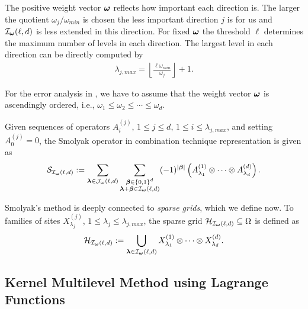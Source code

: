 \documentclass[	a4paper, 
								11pt]{article}
\theoremstyle{plain}
\begin{document}
The positive weight vector $ \boldsymbol{\omega} $ reflects how important each
direction is. The larger the quotient $ \omega_j / \omega_{min} $ is chosen the 
less important direction $ j $ is for us and $ \mathcal{I}_{\boldsymbol{\omega}}(\ell, d) $ is less 
extended in this direction. For fixed $ \boldsymbol{\omega} $ the threshold $ \ell $ determines the maximum number of levels in each direction. The largest level in 
each direction can be directly computed by 
\begin{align*}
 \lambda_{j, max} = \left \lfloor \frac{\ell \omega_{min}}{\omega_j} \right
 \rfloor + 1.
\end{align*}

\begin{remark}
For the error analysis in \cite{kempf:TPML}, we have to assume that the weight
vector $ \boldsymbol{\omega} $ is ascendingly ordered, i.e., $ \omega_1 \leq \omega_2 \leq 
\cdots \leq \omega_d $.
\end{remark}

Given sequences of operators $ A^{(j)}_i $, $ 1 \leq j \leq d $, $ 1 \leq i \leq \lambda_{j,max} $, and setting $ A^{(j)}_0 = 0 $, the Smolyak operator in combination technique representation is given as 
\begin{align*}
    \mathcal{S}_{\mathcal{I}_{\boldsymbol{\omega}}(\ell,d)} := \sum_{\boldsymbol{\lambda} \in \mathcal{J}_{\boldsymbol{\omega}}(\ell,d)} \sum_{\substack{\boldsymbol{\beta} \in \{0,1\}^d \\ \boldsymbol{\lambda} + \boldsymbol{\beta} \in \mathcal{I}_{\boldsymbol{\omega}}(\ell,d)}} (-1)^{|\boldsymbol{\beta}|} \left( A^{(1)}_{\lambda_1} \otimes \cdots \otimes A^{(d)}_{\lambda_d} \right).
\end{align*}

Smolyak's method is deeply connected to \emph{sparse grids}, which we define now. To families of sites $ X_{\lambda_j}^{(j)} $, $ 1 \leq \lambda_j \leq \lambda_{j,max} $, the sparse grid $ \mathcal{H}_{\mathcal{I}_{\boldsymbol{\omega}}(\ell,d)} \subseteq \Omega $ is defined as
\begin{align*}
    \mathcal{H}_{\mathcal{I}_{\boldsymbol{\omega}}(\ell,d)} := \bigcup_{\boldsymbol{\lambda} \in \mathcal{I}_{\boldsymbol{\omega}}(\ell,d)} X^{(1)}_{\lambda_1} \otimes \cdots \otimes X^{(d)}_{\lambda_d}.
\end{align*}

\subsection{Kernel Multilevel Method using Lagrange Functions}
\end{document}

